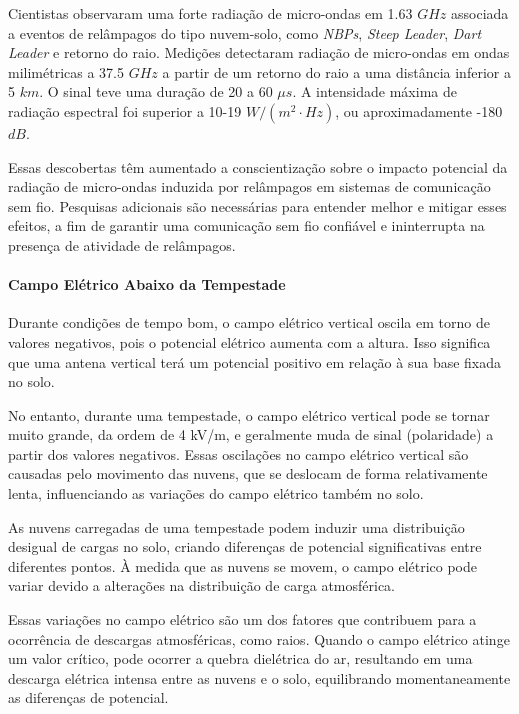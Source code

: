 \documentclass[a4paper, 12pt, onecolumn,singlespacing]{article}
\begin{document}
	Cientistas observaram uma forte radiação de micro-ondas em 1.63 $GHz$ associada a eventos de relâmpagos do tipo nuvem-solo, como \textit{NBPs}, \textit{Steep Leader}, \textit{Dart Leader} e retorno do raio. Medições detectaram radiação de micro-ondas em ondas milimétricas a 37.5 $GHz$ a partir de um retorno do raio a uma distância inferior a 5 $km$. O sinal teve uma duração de 20 a 60 $\mu s$. A intensidade máxima de radiação espectral foi superior a 10-19 $W/(m^2·Hz)$, ou aproximadamente -180 $dB$.
	
	Essas descobertas têm aumentado a conscientização sobre o impacto potencial da radiação de micro-ondas induzida por relâmpagos em sistemas de comunicação sem fio. Pesquisas adicionais são necessárias para entender melhor e mitigar esses efeitos, a fim de garantir uma comunicação sem fio confiável e ininterrupta na presença de atividade de relâmpagos.
	
	
	\paragraph{Campo Elétrico Abaixo da Tempestade}
	
	Durante condições de tempo bom, o campo elétrico vertical oscila em torno de valores negativos, pois o potencial elétrico aumenta com a altura. Isso significa que uma antena vertical terá um potencial positivo em relação à sua base fixada no solo.
	
	No entanto, durante uma tempestade, o campo elétrico vertical pode se tornar muito grande, da ordem de 4 kV/m, e geralmente muda de sinal (polaridade) a partir dos valores negativos. Essas oscilações no campo elétrico vertical são causadas pelo movimento das nuvens, que se deslocam de forma relativamente lenta, influenciando as variações do campo elétrico também no solo.
	
	As nuvens carregadas de uma tempestade podem induzir uma distribuição desigual de cargas no solo, criando diferenças de potencial significativas entre diferentes pontos. À medida que as nuvens se movem, o campo elétrico pode variar devido a alterações na distribuição de carga atmosférica.
	
	Essas variações no campo elétrico são um dos fatores que contribuem para a ocorrência de descargas atmosféricas, como raios. Quando o campo elétrico atinge um valor crítico, pode ocorrer a quebra dielétrica do ar, resultando em uma descarga elétrica intensa entre as nuvens e o solo, equilibrando momentaneamente as diferenças de potencial.
	
\end{document}
